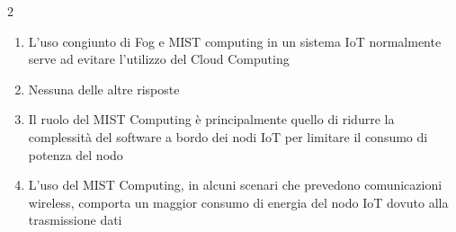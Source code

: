 \documentclass[10pt]{article}
\begin{document}
\begin{multicols}{2}
\begin{enumerate}[label=\arabic*.]
\item L’uso congiunto di Fog e MIST computing in un sistema IoT normalmente serve ad evitare l’utilizzo del Cloud Computing
\item Nessuna delle altre risposte
\item Il ruolo del MIST Computing è principalmente quello di ridurre la complessità del software a bordo dei nodi IoT per limitare il consumo di potenza del nodo
\item L’uso del MIST Computing, in alcuni scenari che prevedono comunicazioni wireless, comporta un maggior consumo di energia del nodo IoT dovuto alla trasmissione dati
\end{enumerate}
\end{multicols}

\newpage
\end{document}
